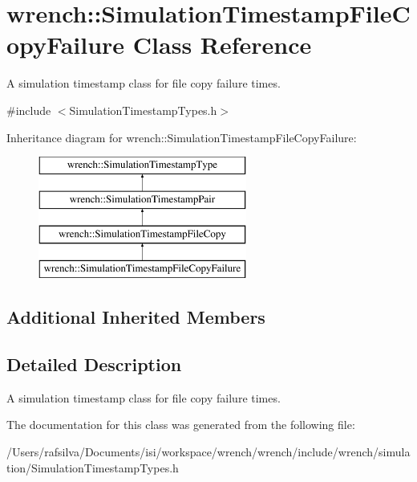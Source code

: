 \hypertarget{classwrench_1_1_simulation_timestamp_file_copy_failure}{}\section{wrench\+:\+:Simulation\+Timestamp\+File\+Copy\+Failure Class Reference}
\label{classwrench_1_1_simulation_timestamp_file_copy_failure}


A simulation timestamp class for file copy failure times.  




{\ttfamily \#include $<$Simulation\+Timestamp\+Types.\+h$>$}

Inheritance diagram for wrench\+:\+:Simulation\+Timestamp\+File\+Copy\+Failure\+:\begin{figure}[H]
\begin{center}
\leavevmode
\includegraphics[height=4.000000cm]{classwrench_1_1_simulation_timestamp_file_copy_failure}
\end{center}
\end{figure}
\subsection*{Additional Inherited Members}


\subsection{Detailed Description}
A simulation timestamp class for file copy failure times. 

The documentation for this class was generated from the following file\+:\begin{DoxyCompactItemize}
\item 
/\+Users/rafsilva/\+Documents/isi/workspace/wrench/wrench/include/wrench/simulation/Simulation\+Timestamp\+Types.\+h\end{DoxyCompactItemize}
